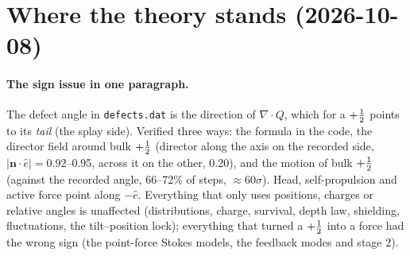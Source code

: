 \section{Where the theory stands (2026-10-08)}\label{sec:status}
\paragraph{The sign issue in one paragraph.} The defect angle in \texttt{defects.dat} is the direction of $\nabla\!\cdot Q$, which for a $+\tfrac12$ points
to its \emph{tail} (the splay side). Verified three ways: the formula in the code, the director field around bulk $+\tfrac12$ (director along the axis on the
recorded side, $|\mathbf n\cdot\hat e|=0.92$--0.95, across it on the other, 0.20), and the motion of bulk $+\tfrac12$ (against the recorded angle, 66--72\% of steps,
$\approx60\sigma$). Head, self-propulsion and active force point along $-\hat e$. Everything that only uses positions, charges or relative angles is
unaffected (distributions, charge, survival, depth law, shielding, fluctuations, the tilt--position lock); everything that turned a $+\tfrac12$ into a force
had the wrong sign (the point-force Stokes models, the feedback modes and stage 2).

